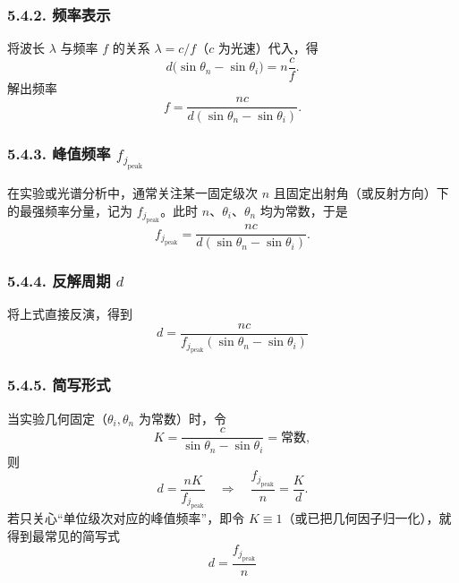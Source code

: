 \documentclass[withoutpreface,bwprint]{cumcmthesis}
\begin{document}
\subsubsection*{5.4.2. 频率表示}
将波长 $\lambda$ 与频率 $f$ 的关系 $\lambda = c/f$（$c$ 为光速）代入，得
\begin{equation}
d\bigl(\sin\theta_n - \sin\theta_i\bigr) = n\frac{c}{f}.
\end{equation}
解出频率
\begin{equation}
f = \frac{n c}{d(\sin\theta_n - \sin\theta_i)}.
\end{equation}

\subsubsection*{5.4.3. 峰值频率 $f_{j_{\text{peak}}}$}
在实验或光谱分析中，通常关注某一固定级次 $n$ 且固定出射角（或反射方向）下的最强频率分量，记为 $f_{j_{\text{peak}}}$。此时 $n$、$\theta_i$、$\theta_n$ 均为常数，于是
\begin{equation}
f_{j_{\text{peak}}} = \frac{n c}{d(\sin\theta_n - \sin\theta_i)}.
\end{equation}

\subsubsection*{5.4.4. 反解周期 $d$}
将上式直接反演，得到
\begin{equation}
d = \frac{n c}{f_{j_{\text{peak}}}(\sin\theta_n - \sin\theta_i)}
\end{equation}

\subsubsection*{5.4.5. 简写形式}
当实验几何固定（$\theta_i,\theta_n$ 为常数）时，令
\begin{equation}
K = \frac{c}{\sin\theta_n - \sin\theta_i} = \text{常数},
\end{equation}
则
\begin{equation}
d = \frac{n K}{f_{j_{\text{peak}}}}
\quad\Longrightarrow\quad
\frac{f_{j_{\text{peak}}}}{n} = \frac{K}{d}.
\end{equation}
若只关心“单位级次对应的峰值频率”，即令 $K\equiv 1$（或已把几何因子归一化），就得到最常见的简写式
\begin{equation}
d = \frac{f_{j_{\text{peak}}}}{n}
\end{equation}
\end{document}
